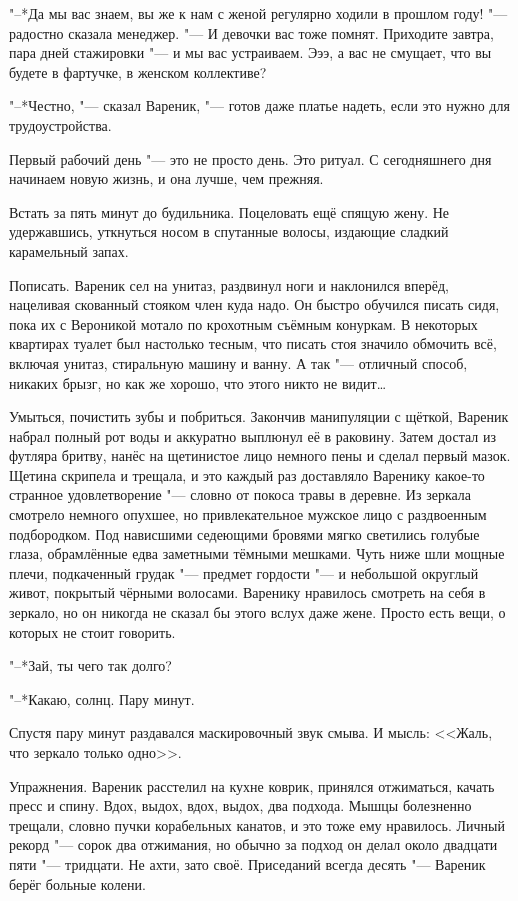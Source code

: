 "--*Да мы вас знаем, вы же к нам с женой регулярно ходили в прошлом году! "--- радостно сказала менеджер.
"--- И девочки вас тоже помнят.
Приходите завтра, пара дней стажировки "--- и мы вас устраиваем.
Эээ, а вас не смущает, что вы будете в фартучке, в женском коллективе?

"--*Честно, "--- сказал Вареник, "--- готов даже платье надеть, если это нужно для трудоустройства.

\asterism

\label{Wed_2012_04_25}

Первый рабочий день "--- это не просто день.
Это ритуал.
С сегодняшнего дня начинаем новую жизнь, и она лучше, чем прежняя.

Встать за пять минут до будильника.
Поцеловать ещё спящую жену.
Не удержавшись, уткнуться носом в спутанные волосы, издающие сладкий карамельный запах.

Пописать.
Вареник сел на унитаз, раздвинул ноги и наклонился вперёд, нацеливая скованный стояком член куда надо.
Он быстро обучился писать сидя, пока их с Вероникой мотало по крохотным съёмным конуркам.
В некоторых квартирах туалет был настолько тесным, что писать стоя значило обмочить всё, включая унитаз, стиральную машину и ванну.
А так "--- отличный способ, никаких брызг, но как же хорошо, что этого никто не видит\ldots{}

Умыться, почистить зубы и побриться.
Закончив манипуляции с щёткой, Вареник набрал полный рот воды и аккуратно выплюнул её в раковину.
Затем достал из футляра бритву, нанёс на щетинистое лицо немного пены и сделал первый мазок.
Щетина скрипела и трещала, и это каждый раз доставляло Варенику какое-то странное удовлетворение "--- словно от покоса травы в деревне.
Из зеркала смотрело немного опухшее, но привлекательное мужское лицо с раздвоенным подбородком.
Под нависшими седеющими бровями мягко светились голубые глаза, обрамлённые едва заметными тёмными мешками.
Чуть ниже шли мощные плечи, подкаченный грудак "--- предмет гордости "--- и небольшой округлый живот, покрытый чёрными волосами.
Варенику нравилось смотреть на себя в зеркало, но он никогда не сказал бы этого вслух даже жене.
Просто есть вещи, о которых не стоит говорить.

"--*Зай, ты чего так долго?

"--*Какаю, солнц.
Пару минут.

Спустя пару минут раздавался маскировочный звук смыва.
И мысль:
<<Жаль, что зеркало только одно>>.

Упражнения.
Вареник расстелил на кухне коврик, принялся отжиматься, качать пресс и спину.
Вдох, выдох, вдох, выдох, два подхода.
Мышцы болезненно трещали, словно пучки корабельных канатов, и это тоже ему нравилось.
Личный рекорд "--- сорок два отжимания, но обычно за подход он делал около двадцати пяти "--- тридцати.
Не ахти, зато своё.
Приседаний всегда десять "--- Вареник берёг больные колени.

